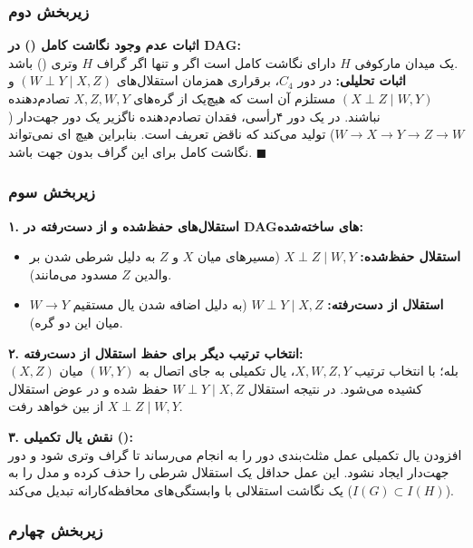 \subsubsection{زیربخش دوم}

\textbf{اثبات عدم وجود نگاشت کامل () در DAG:} \\
یک میدان مارکوفی $H$ دارای نگاشت کامل  است اگر و تنها اگر گراف $H$ وتری () باشد. \\
\textbf{اثبات تحلیلی:} در دور $C_4$، برقراری همزمان استقلال‌های $(W \perp Y \mid X, Z)$ و $(X \perp Z \mid W, Y)$ مستلزم آن است که هیچ‌یک از گره‌های $X, Z, W, Y$ تصادم‌دهنده نباشند. در یک دور ۴رأسی، فقدان تصادم‌دهنده ناگزیر یک دور جهت‌دار ($W \to X \to Y \to Z \to W$) تولید می‌کند که ناقض تعریف  است. بنابراین هیچ ای نمی‌تواند نگاشت کامل برای این گراف بدون جهت باشد. $\blacksquare$

\subsubsection{زیربخش سوم}

\textbf{۱. استقلال‌های حفظ‌شده و از دست‌رفته در DAGهای ساخته‌شده:}
\begin{itemize}
  \item \textbf{استقلال حفظ‌شده:} $X \perp Z \mid W, Y$ (مسیرهای میان $X$ و $Z$ به دلیل شرطی شدن بر والدین $Z$ مسدود می‌مانند).
  \item \textbf{استقلال از دست‌رفته:} $W \perp Y \mid X, Z$ (به دلیل اضافه شدن یال مستقیم $W \to Y$ میان این دو گره).
\end{itemize}

\textbf{۲. انتخاب ترتیب دیگر برای حفظ استقلال از دست‌رفته:} \\
بله؛ با انتخاب ترتیب $X, W, Z, Y$، یال تکمیلی به جای اتصال به $(W, Y)$ میان \textbf{$(X, Z)$} کشیده می‌شود. در نتیجه استقلال $W \perp Y \mid X, Z$ حفظ شده و در عوض استقلال $X \perp Z \mid W, Y$ از بین خواهد رفت.

\textbf{۳. نقش یال تکمیلی ():} \\
افزودن یال تکمیلی عمل مثلث‌بندی دور را به انجام می‌رساند تا گراف وتری شود و دور جهت‌دار ایجاد نشود. این عمل حداقل یک استقلال شرطی را حذف کرده و مدل را به یک نگاشت استقلالی با وابستگی‌های محافظه‌کارانه تبدیل می‌کند ($I(G) \subset I(H)$).

\subsubsection{زیربخش چهارم}

